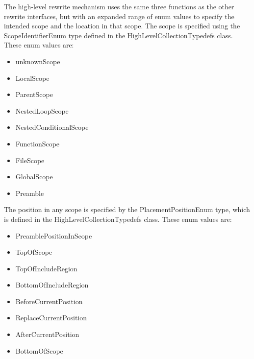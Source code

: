     The high-level rewrite mechanism uses the same three functions as the other rewrite
interfaces, but with an expanded range of enum values to specify the intended scope
and the location in that scope.  The scope is specified using the ScopeIdentifierEnum
type defined in the HighLevelCollectionTypedefs class. These enum values are:
\begin{itemize}
   \item unknownScope
   \item LocalScope 
   \item ParentScope 
   \item NestedLoopScope
   \item NestedConditionalScope
   \item FunctionScope
   \item FileScope
   \item GlobalScope
   \item Preamble
\end{itemize}
The position in any scope is specified by the PlacementPositionEnum
type, which is defined in the HighLevelCollectionTypedefs class. 
These enum values are:
\begin{itemize}
     \item PreamblePositionInScope
     \item TopOfScope
     \item TopOfIncludeRegion
     \item BottomOfIncludeRegion
     \item BeforeCurrentPosition
     \item ReplaceCurrentPosition
     \item AfterCurrentPosition
     \item BottomOfScope
\end{itemize}

